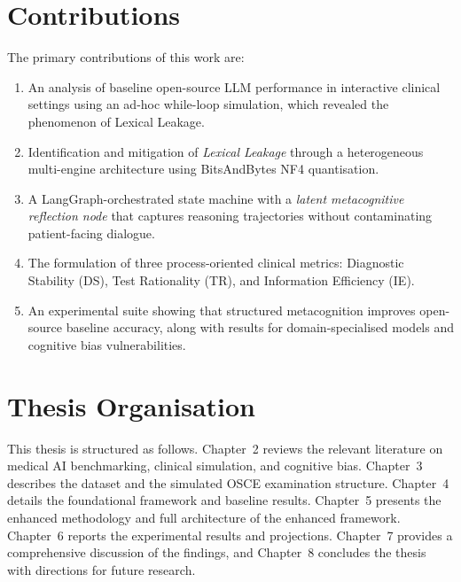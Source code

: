 \section{Contributions}

The primary contributions of this work are:
\begin{enumerate}
    \item An analysis of baseline open-source LLM performance in interactive clinical settings using an ad-hoc while-loop simulation, which revealed the phenomenon of Lexical Leakage.
    \item Identification and mitigation of \textit{Lexical Leakage} through a heterogeneous multi-engine architecture using BitsAndBytes NF4 quantisation.
    \item A LangGraph-orchestrated state machine with a \textit{latent metacognitive reflection node} that captures reasoning trajectories without contaminating patient-facing dialogue.
    \item The formulation of three process-oriented clinical metrics: Diagnostic Stability (DS), Test Rationality (TR), and Information Efficiency (IE).
    \item An experimental suite showing that structured metacognition improves open-source baseline accuracy, along with results for domain-specialised models and cognitive bias vulnerabilities.
\end{enumerate}

\section{Thesis Organisation}

This thesis is structured as follows. Chapter~2 reviews the relevant literature on medical AI benchmarking, clinical simulation, and cognitive bias. Chapter~3 describes the dataset and the simulated OSCE examination structure. Chapter~4 details the foundational framework and baseline results. Chapter~5 presents the enhanced methodology and full architecture of the enhanced framework. Chapter~6 reports the experimental results and projections. Chapter~7 provides a comprehensive discussion of the findings, and Chapter~8 concludes the thesis with directions for future research.
